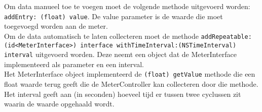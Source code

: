Om data manueel toe te voegen moet de volgende methode uitgevoerd worden: \texttt{\justify addEntry: (float) value}. De value parameter is de waarde die moet toegevoegd worden aan de meter. \\

Om de data automatisch te laten collecteren moet de methode \texttt{\justify addRepeatable:(id<MeterInterface>) interface withTimeInterval:(NSTimeInterval) interval} uitgevoerd worden. Deze neemt een object dat de MeterInterface implementeerd als parameter en een interval.\\
Het MeterInterface object implementeerd de \texttt{\justify (float) getValue} methode die een float waarde terug geeft die de MeterController kan collecteren door die methode.\\
Het interval geeft aan (in seconden) hoeveel tijd er tussen twee cyclussen zit waarin de waarde opgehaald wordt.
